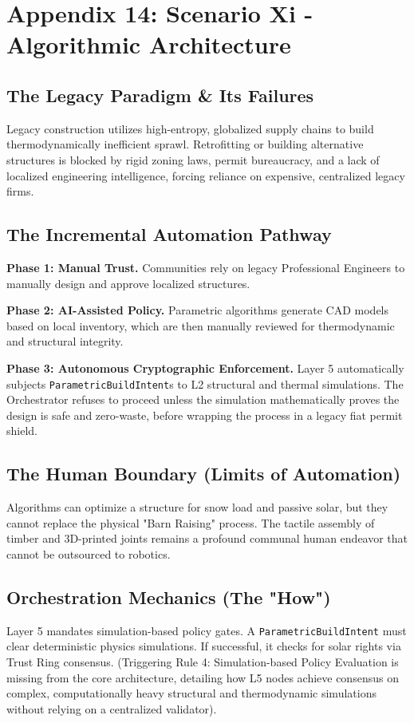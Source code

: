 \chapter{Appendix 14: Scenario Xi - Algorithmic Architecture}

\section{The Legacy Paradigm \& Its Failures}
Legacy construction utilizes high-entropy, globalized supply chains to build thermodynamically inefficient sprawl. Retrofitting or building alternative structures is blocked by rigid zoning laws, permit bureaucracy, and a lack of localized engineering intelligence, forcing reliance on expensive, centralized legacy firms.

\section{The Incremental Automation Pathway}
\textbf{Phase 1: Manual Trust.} Communities rely on legacy Professional Engineers to manually design and approve localized structures.

\textbf{Phase 2: AI-Assisted Policy.} Parametric algorithms generate CAD models based on local inventory, which are then manually reviewed for thermodynamic and structural integrity.

\textbf{Phase 3: Autonomous Cryptographic Enforcement.} Layer 5 automatically subjects \texttt{ParametricBuildIntent}s to L2 structural and thermal simulations. The Orchestrator refuses to proceed unless the simulation mathematically proves the design is safe and zero-waste, before wrapping the process in a legacy fiat permit shield.

\section{The Human Boundary (Limits of Automation)}
Algorithms can optimize a structure for snow load and passive solar, but they cannot replace the physical "Barn Raising" process. The tactile assembly of timber and 3D-printed joints remains a profound communal human endeavor that cannot be outsourced to robotics.

\section{Orchestration Mechanics (The "How")}
Layer 5 mandates simulation-based policy gates. A \texttt{ParametricBuildIntent} must clear deterministic physics simulations. If successful, it checks for solar rights via Trust Ring consensus. (Triggering Rule 4: Simulation-based Policy Evaluation is missing from the core architecture, detailing how L5 nodes achieve consensus on complex, computationally heavy structural and thermodynamic simulations without relying on a centralized validator).
